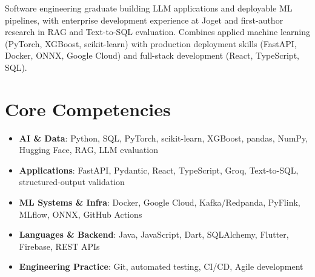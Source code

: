 \documentclass[11pt,a4paper,sans]{moderncv}
\begin{document}
\makecvtitle


\vspace{6pt}
\small{Software engineering graduate building LLM applications and deployable ML pipelines, with enterprise development experience at Joget and first-author research in RAG and Text-to-SQL evaluation. Combines applied machine learning (PyTorch, XGBoost, scikit-learn) with production deployment skills (FastAPI, Docker, ONNX, Google Cloud) and full-stack development (React, TypeScript, SQL).}


\section{Core Competencies}
\vspace{1pt}
\begin{itemize}

\item \textbf{AI \& Data}: Python, SQL, PyTorch, scikit-learn, XGBoost, pandas, NumPy, Hugging Face, RAG, LLM evaluation

\item \textbf{Applications}: FastAPI, Pydantic, React, TypeScript, Groq, Text-to-SQL, structured-output validation

\item \textbf{ML Systems \& Infra}: Docker, Google Cloud, Kafka/Redpanda, PyFlink, MLflow, ONNX, GitHub Actions

\item \textbf{Languages \& Backend}: Java, JavaScript, Dart, SQLAlchemy, Flutter, Firebase, REST APIs

\item \textbf{Engineering Practice}: Git, automated testing, CI/CD, Agile development

\end{itemize}

\end{document}
